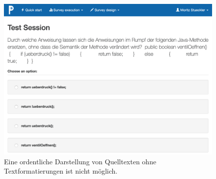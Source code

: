 \begin{figure}[H]
    \includegraphics[width=12cm]{chapter/bewertung/bilder/pingo_problem1.png}
    \centering
    \caption[Darstellung von Quelltexten in Pingo]{Eine ordentliche Darstellung von Quelltexten ohne Textformatierungen ist nicht möglich.}
    \label{abb:pingo_frage}
\end{figure}
